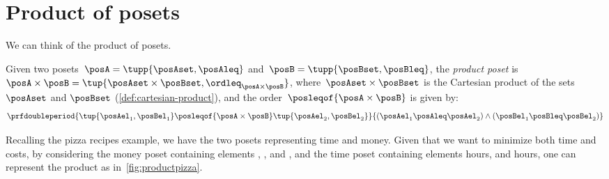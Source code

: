 
\section{Product of posets}
We can think of the product of posets.

\begin{definition}
    \label{def:productposet}
    Given two posets~$\posA=\tupp{\posAset, \posAleq}$
    and~$\posB=\tupp{\posBset, \posBleq}$, the \emph{product poset} is~$\posA\times \posB=\tup{\posAset \times \posBset, \ordleq_{\posA\times \posB}}$, where~$\posAset \times \posBset$ is the Cartesian product of the sets~$\posAset$ and $\posBset$ (\cref{def:cartesian-product}), and the order~$\posleqof{\posA \times \posB}$ is given by:
    \begin{equation}
        \prfdoubleperiod{\tup{\posAel_1, \posBel_1}
            \posleqof{\posA\times \posB}
            \tup{\posAel_2, \posBel_2}}{(\posAel_1 \posAleq \posAel_2) \wedge
            (\posBel_1 \posBleq \posBel_2)}
    \end{equation}
\end{definition}
Recalling the pizza recipes example, we have the two posets representing time and money.
Given that we want to minimize both time and costs, by considering the money poset containing elements \unit[10]{\CHF}, \unit[20]{\CHF}, and \unit[30]{\CHF}, and the time poset containing elements \unit[1]{hours}, and \unit[2]{hours}, one can represent the product as in~\cref{fig:productpizza}.


\begin{figure*}[h!]
    \centering
    \caption{Product poset of time and cost for pizza recipes.}
    \label{fig:productpizza}
\end{figure*}

